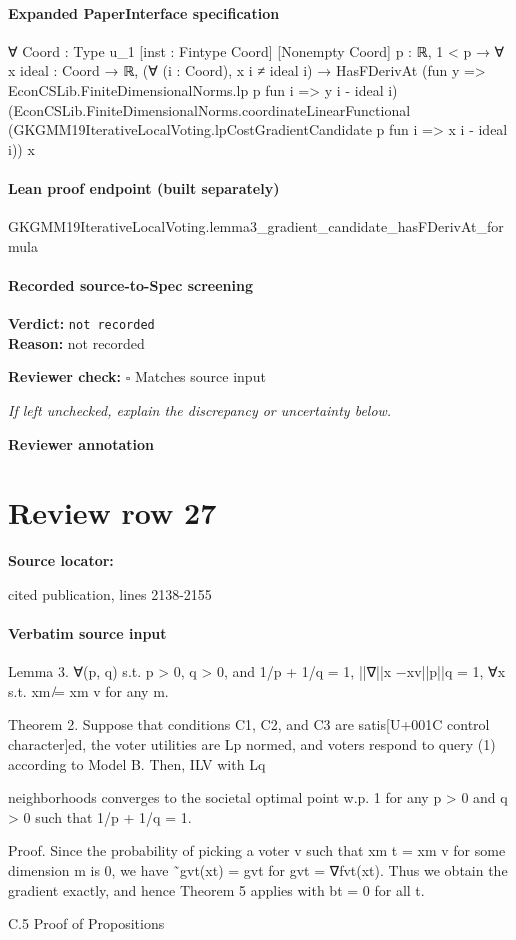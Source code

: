 \documentclass[10pt]{article}
\newcommand{\reviewerbox}{%
  \par\noindent\fbox{\parbox{0.96\linewidth}{\rule{0pt}{0.38in}}}\par
}
\newcommand{\reviewmatch}[1]{%
  \par\noindent\textbf{Reviewer check:} $\square$\; #1\par
  \noindent\emph{If left unchecked, explain the discrepancy or uncertainty below.}\par
}
\begin{document}
\paragraph{Expanded PaperInterface specification}
\begin{ReviewVerbatim}
∀ {Coord : Type u_1} [inst : Fintype Coord] [Nonempty Coord] {p : ℝ},
  1 < p →
    ∀ {x ideal : Coord → ℝ},
      (∀ (i : Coord), x i ≠ ideal i) →
        HasFDerivAt (fun y => EconCSLib.FiniteDimensionalNorms.lp p fun i => y i - ideal i)
          (EconCSLib.FiniteDimensionalNorms.coordinateLinearFunctional
            (GKGMM19IterativeLocalVoting.lpCostGradientCandidate p fun i => x i - ideal i))
          x
\end{ReviewVerbatim}

\paragraph{Lean proof endpoint (built separately)}\begin{ReviewVerbatim}
GKGMM19IterativeLocalVoting.lemma3_gradient_candidate_hasFDerivAt_formula
\end{ReviewVerbatim}

\paragraph{Recorded source-to-Spec screening}
\textbf{Verdict:} \texttt{not recorded}
\\
\textbf{Reason:} not recorded
\reviewmatch{Matches source input}
\noindent\textbf{Reviewer annotation}\par
\reviewerbox
\clearpage
\hypertarget{source-claim-086c0a9eaf7439f7}{}
\section*{Review row 27}
\textbf{Source locator:} {\footnotesize\raggedright cited publication, lines 2138-\allowbreak{}2155\par}
\paragraph{Verbatim source input}
\begin{ReviewVerbatim}
Lemma 3. ∀(p, q) s.t. p > 0, q > 0, and 1/p + 1/q = 1, ||∇||x −xv||p||q = 1, ∀x s.t.
xm ̸= xm
v for any m.

Theorem 2. Suppose that conditions C1, C2, and C3 are satis[U+001C control character]ed, the voter utilities are
Lp normed, and voters respond to query (1) according to Model B. Then, ILV with Lq

neighborhoods converges to the societal optimal point w.p. 1 for any p > 0 and q > 0 such
that 1/p + 1/q = 1.

Proof. Since the probability of picking a voter v such that xm
t = xm
v for some dimension m
is 0, we have ˜gvt(xt) = gvt for gvt = ∇fvt(xt). Thus we obtain the gradient exactly, and
hence Theorem 5 applies with bt = 0 for all t.

C.5 Proof of Propositions
\end{ReviewVerbatim}
\end{document}
